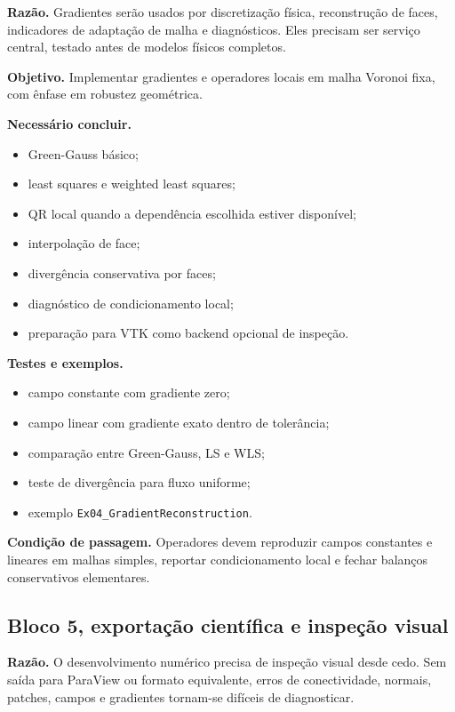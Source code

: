\documentclass[11pt,a4paper]{article}
\begin{document}
\textbf{Raz\~ao.} Gradientes ser\~ao usados por discretiza\c{c}\~ao f\'isica, reconstru\c{c}\~ao de faces, indicadores de adapta\c{c}\~ao de malha e diagn\'osticos. Eles precisam ser servi\c{c}o central, testado antes de modelos f\'isicos completos.

\textbf{Objetivo.} Implementar gradientes e operadores locais em malha Voronoi fixa, com \^enfase em robustez geom\'etrica.

\textbf{Necess\'ario concluir.}
\begin{itemize}
  \item Green-Gauss b\'asico;
  \item least squares e weighted least squares;
  \item QR local quando a depend\^encia escolhida estiver dispon\'ivel;
  \item interpola\c{c}\~ao de face;
  \item diverg\^encia conservativa por faces;
  \item diagn\'ostico de condicionamento local;
  \item prepara\c{c}\~ao para VTK como backend opcional de inspe\c{c}\~ao.
\end{itemize}

\textbf{Testes e exemplos.}
\begin{itemize}
  \item campo constante com gradiente zero;
  \item campo linear com gradiente exato dentro de toler\^ancia;
  \item compara\c{c}\~ao entre Green-Gauss, LS e WLS;
  \item teste de diverg\^encia para fluxo uniforme;
  \item exemplo \texttt{Ex04\_GradientReconstruction}.
\end{itemize}

\textbf{Condi\c{c}\~ao de passagem.} Operadores devem reproduzir campos constantes e lineares em malhas simples, reportar condicionamento local e fechar balan\c{c}os conservativos elementares.

\subsection*{Bloco 5, exporta\c{c}\~ao cient\'ifica e inspe\c{c}\~ao visual}

\textbf{Raz\~ao.} O desenvolvimento num\'erico precisa de inspe\c{c}\~ao visual desde cedo. Sem sa\'ida para ParaView ou formato equivalente, erros de conectividade, normais, patches, campos e gradientes tornam-se dif\'iceis de diagnosticar.
\end{document}
